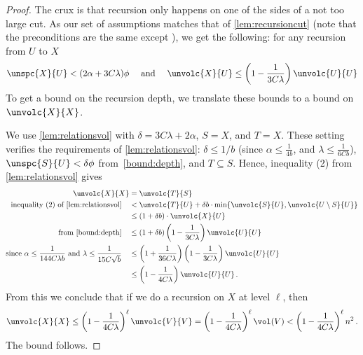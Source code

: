\begin{proof}
	The crux is that recursion only happens on one of the sides of a not too large cut. As our set of assumptions matches that of \cref{lem:recursioncut} (note that the preconditions are the same except ), we get the following: for any recursion from $U$ to $X$
	\begin{equation}
		\label{bound:depth}
		\unspc{X}{U} < (2\alpha+3C\lambda)\phi \quad \text{ and } \quad \unvolc{X}{U} \le \left(1-\frac{1}{3C\lambda}\right) \unvolc{U}{U}
	\end{equation}
	To get a bound on the recursion depth, we translate these bounds to a bound on $\unvolc{X}{X}$.
	
	We use \cref{lem:relationsvol} with $\delta=3C\lambda+2\alpha$, $S=X$, and $T=X$. These setting verifies the requirements of \cref{lem:relationsvol}: $\delta \le 1/b$ (since $\alpha \le \frac{1}{4b}$, and $\lambda \leq \frac{1}{6Cb}$), $\unspc{S}{U} < \delta \phi$ from~\eqref{bound:depth}, and $T \subseteq S$. Hence, inequality (2) from \cref{lem:relationsvol} gives
	\begin{align*}
		\unvolc{X}{X}& = \unvolc{T}{S} \\
		\text{inequality (2) of~\cref{lem:relationsvol}}\quad &< \unvolc{T}{U} + \delta b \cdot \min\{\unvolc{S}{U}, \unvolc{U \setminus S}{U}\} \\
		& \le  (1+\delta b) \cdot \unvolc{X}{U} \\
		\text{from~\eqref{bound:depth}}\quad & \le \left(1+\delta b\right) \left(1-\frac{1}{3C\lambda}\right) \unvolc{U}{U} \\
		\text{since $\alpha \le \frac{1}{144C\lambda b}$ and $\lambda \le \frac{1}{15C \sqrt{b}}$}\quad & \le \left(1+\frac{1}{36C\lambda}\right) \left(1-\frac{1}{3C\lambda}\right) \unvolc{U}{U} \\
		& \le  \left(1-\frac{1}{4C\lambda}\right) \unvolc{U}{U} \, .
	\end{align*}
	From this we conclude that if we do a recursion on $X$ at level $\ell$, then
	\begin{equation*}
	\unvolc{X}{X} \le  \left(1-\frac{1}{4C\lambda}\right)^\ell \unvolc{V}{V} =  \left(1-\frac{1}{4C\lambda}\right)^\ell \vol(V) <  \left(1-\frac{1}{4C\lambda}\right)^\ell n^2 \, .
	\end{equation*}
	The bound follows.
\end{proof}

